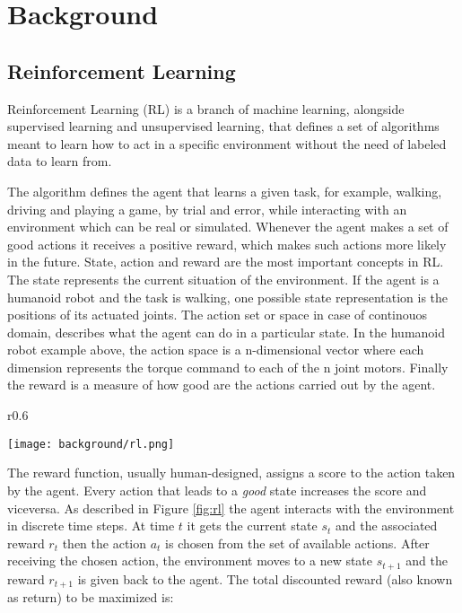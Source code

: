 \chapter{Background}

\section{Reinforcement Learning}

Reinforcement Learning (RL) is a branch of machine learning, alongside supervised learning and unsupervised learning, that defines a set of algorithms meant to learn how to act in a specific environment without the need of labeled data to learn from. 

The algorithm defines the agent that learns a given task, for example, walking, driving and playing a game, by trial and error, while interacting with an environment which can be real or simulated. Whenever the agent makes a set of good actions it receives a positive reward, which makes such actions more likely in the future. State, action and reward are the most important concepts in RL. The state represents the current situation of the environment. If the agent is a humanoid robot and the task is walking, one possible state representation is the positions of its actuated joints. The action set or space in case of continouos domain, describes what the agent can do in a particular state. In the humanoid robot example above, the action space is a n-dimensional vector where each dimension represents the torque command to each of the n joint motors. Finally the reward is a measure of how good are the actions carried out by the agent. 

\begin{wrapfigure}{r}{0.6\textwidth}
  \begin{center}
    \texttt{[image: background/rl.png]}
  \end{center}
  \caption{Basic reinforcement learning}
  \label{fig:rl}
\end{wrapfigure}

The reward function, usually human-designed, assigns a score to the action taken by the agent. Every action that leads to a \textit{good} state increases the score and viceversa. As described in Figure \ref{fig:rl} the agent interacts with the environment in discrete time steps. At time $t$ it gets the current state $s_{t}$ and the associated reward $r_{t}$ then the action $a_{t}$ is chosen from the set of available actions. After receiving the chosen action, the environment moves to a new state $s_{t+1}$ and the reward $r_{t+1}$ is given back to the agent. The total discounted reward (also known as return) to be maximized is:

